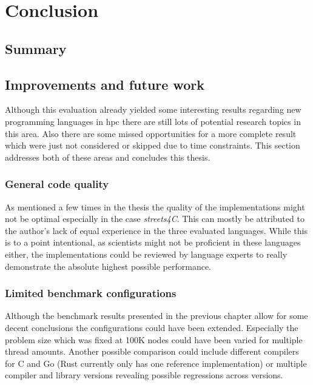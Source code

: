 \chapter{Conclusion}
\label{ch:Conclusion}


\section{Summary}
\label{sec:Conclusion::Summary}

\section{Improvements and future work}
\label{sec:Conclusion::Improvements}

Although this evaluation already yielded some interesting results regarding new programming languages in \gls{hpc} there are still lots of potential research topics in this area. Also there are some missed opportunities for a more complete result which were just not considered or skipped due to time constraints. This section addresses both of these areas and concludes this thesis.

\subsection*{General code quality}
\label{subsec:Conclusion::Improvements::CodeQuality}

As mentioned a few times in the thesis the quality of the implementations might not be optimal especially in the case \textit{streets4C}. This can mostly be attributed to the author's lack of equal experience in the three evaluated languages. While this is to a point intentional, as scientists might not be proficient in these languages either, the implementations could be reviewed by language experts to really demonstrate the absolute highest possible performance.

\subsection*{Limited benchmark configurations}
\label{subsec:Conclusion::Improvements::Configuration}

Although the benchmark results presented in the previous chapter allow for some decent conclusions the configurations could have been extended. Especially the problem size which was fixed at 100K nodes could have been varied for multiple thread amounts. Another possible comparison could include different compilers for C and Go (Rust currently only has one reference implementation) or multiple compiler and library versions revealing possible regressions across versions.


